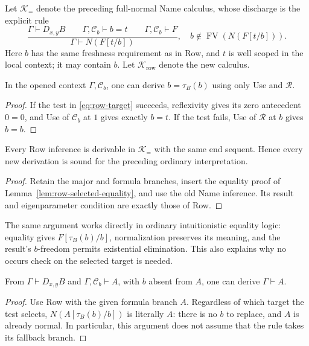 Let $\mathcal K_{=}$ denote the preceding full-normal Name calculus,
whose discharge is the explicit rule
\[
 \frac{\Gamma\vdash D_{x,y}B\qquad\Gamma,\mathcal C_b\vdash b=t
       \qquad\Gamma,\mathcal C_b\vdash F}
      {\Gamma\vdash N(F[t/b])},
 \quad b\notin\operatorname{FV}(N(F[t/b])).
 \tag{Name}
\]
Here $b$ has the same freshness requirement as in Row, and $t$ is
well scoped in the local context; it may contain $b$.  Let $\mathcal K_{\mathrm{row}}$ denote the new calculus.

\begin{lemma}
\label{lem:row-selected-equality}
In the opened context $\Gamma,\mathcal C_b$, one can derive
$b=\tau_B(b)$ using only Use and $\mathcal R$.
\end{lemma}
\begin{proof}
If the test in \eqref{eq:row-target} succeeds, reflexivity gives its zero
antecedent $0=0$, and Use of $\mathcal C_b$ at $1$ gives exactly $b=t$.
If the test fails, Use of $\mathcal R$ at $b$ gives $b=b$.
\end{proof}

\begin{corollary}
\label{cor:row-soundness}
Every Row inference is derivable in $\mathcal K_{=}$ with the same end
sequent.  Hence every new derivation is sound for the preceding ordinary
interpretation.
\end{corollary}
\begin{proof}
Retain the major and formula branches, insert the equality proof of
Lemma~\ref{lem:row-selected-equality}, and use the old Name inference.
Its result and eigenparameter condition are exactly those of Row.
\end{proof}

The same argument works directly in ordinary intuitionistic equality
logic: equality gives $F[\tau_B(b)/b]$, normalization preserves its
meaning, and the result's $b$-freedom permits existential elimination.
This also explains why no occurs check on the selected target is needed.

\begin{lemma}
\label{lem:row-ordinary-elimination}
From $\Gamma\vdash D_{x,y}B$ and
$\Gamma,\mathcal C_b\vdash A$, with $b$ absent from $A$, one can derive
$\Gamma\vdash A$.
\end{lemma}
\begin{proof}
Use Row with the given formula branch $A$.  Regardless of which target
the test selects, $N(A[\tau_B(b)/b])$ is literally $A$: there is no $b$ to
replace, and $A$ is already normal.  In particular, this argument does
not assume that the rule takes its fallback branch.
\end{proof}


